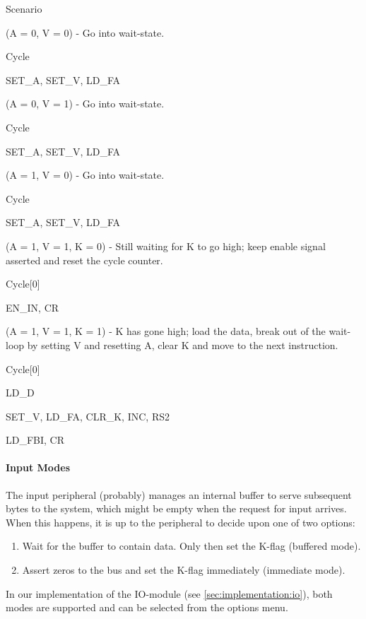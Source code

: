 \begin{labeledenum}{Scenario}
  \item (A = 0, V = 0) - Go into wait-state.
    \begin{labeledenum}{Cycle}
    \item SET\_A, SET\_V, LD\_FA
    \end{labeledenum}

  \item (A = 0, V = 1) - Go into wait-state.
    \begin{labeledenum}{Cycle}
    \item SET\_A, SET\_V, LD\_FA
    \end{labeledenum}

  \item (A = 1, V = 0) - Go into wait-state.
    \begin{labeledenum}{Cycle}
    \item SET\_A, SET\_V, LD\_FA
    \end{labeledenum}

  \item (A = 1, V = 1, K = 0) - Still waiting for K to go high; keep enable signal asserted and reset the cycle counter.
    \begin{labeledenum}{Cycle}[0]
    \item EN\_IN, CR
    \end{labeledenum}

  \item (A = 1, V = 1, K = 1) - K has gone high; load the data, break out of the wait-loop by setting V and resetting A, clear K and move to the next instruction.
    \begin{labeledenum}{Cycle}[0]
    \item LD\_D
    \item SET\_V, LD\_FA, CLR\_K, INC, RS2
    \item LD\_FBI, CR
    \end{labeledenum}
\end{labeledenum}


\paragraph{Input Modes} The input peripheral (probably) manages an internal buffer to serve subsequent bytes to the system, which might be empty when the request for input arrives. When this happens, it is up to the peripheral to decide upon one of two options:

\begin{enumerate}
\item Wait for the buffer to contain data. Only then set the K-flag (buffered mode).
\item Assert zeros to the bus and set the K-flag immediately (immediate mode).
\end{enumerate}
In our implementation of the IO-module (see \ref{sec:implementation:io}), both modes are supported and can be selected from the options menu.

